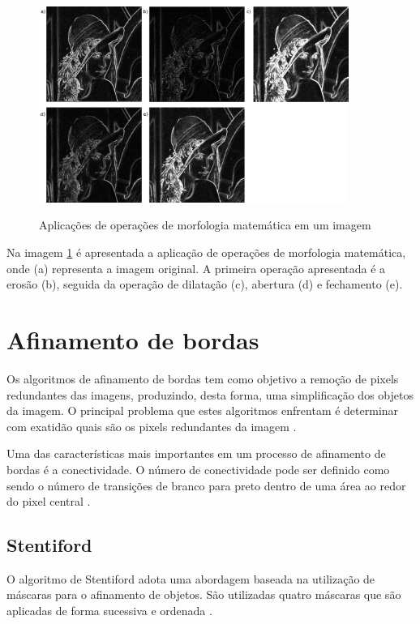 \documentclass[
	12pt,				%
	oneside,			%
	a4paper,			%
	english,			%
	french,				%
	spanish,			%
	brazil,				%
	]{abntex2}
\begin{document}
\begin{figure}[ht]
\centering
\caption{Aplicações de operações de morfologia matemática em um imagem}
\includegraphics[width=0.9\textwidth]{imagens/morfologia.png}
\sourceAuthor
\label{fig:morfologia}
\end{figure}

Na imagem \ref{fig:morfologia} é apresentada a aplicação de operações de morfologia matemática, onde (a) representa a imagem original. A primeira operação apresentada é a erosão (b), seguida da operação de dilatação (c), abertura (d) e fechamento (e).
    
\section{Afinamento de bordas}    

Os algoritmos de afinamento de bordas tem como objetivo a remoção de pixels redundantes das imagens, produzindo, desta forma, uma simplificação dos objetos da imagem. O principal problema que estes algoritmos enfrentam é determinar com exatidão quais são os pixels redundantes da imagem \cite{guilherme:2007}.

Uma das características mais importantes em um processo de afinamento de bordas é a conectividade. O número de conectividade pode ser definido como sendo o número de transições de branco para preto dentro de uma área ao redor do pixel central \cite{guilherme:2007}.
    
\subsection{Stentiford}    

O algoritmo de Stentiford adota uma abordagem baseada na utilização de máscaras para o afinamento de objetos. São utilizadas quatro máscaras que são aplicadas de forma sucessiva e ordenada \cite{guilherme:2007}.
\end{document}
